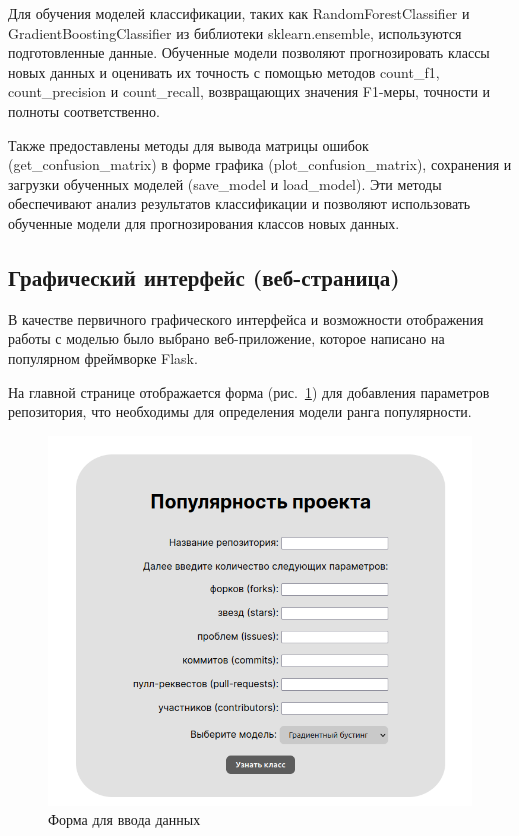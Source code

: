 Для обучения моделей классификации, таких как RandomForestClassifier и GradientBoostingClassifier из библиотеки sklearn.ensemble, используются подготовленные данные. Обученные модели позволяют прогнозировать классы новых данных и оценивать их точность с помощью методов count\_f1, count\_precision и count\_recall, возвращающих значения F1-меры, точности и полноты соответственно.

Также предоставлены методы для вывода матрицы ошибок (get\_confusion\_matrix) в форме графика (plot\_confusion\_matrix), сохранения и загрузки обученных моделей (save\_model и load\_model). Эти методы обеспечивают анализ результатов классификации и позволяют использовать обученные модели для прогнозирования классов новых данных.

\subsection{Графический интерфейс (веб-страница)}
\label{subsec:gui}

В качестве первичного графического интерфейса и возможности отображения работы с моделью было выбрано веб-приложение, которое написано на популярном фреймворке Flask. 

На главной странице отображается форма (рис.~\ref{ris:form-data}) для добавления параметров репозитория, что необходимы для определения модели ранга популярности. 

\begin{center}
    \begin{figure}[H]
        \includegraphics[scale=0.5]{pic/form-data.png}
        \caption{Форма для ввода данных}
        \label{ris:form-data}
    \end{figure}
\end{center}
\vspace{1.5em}

